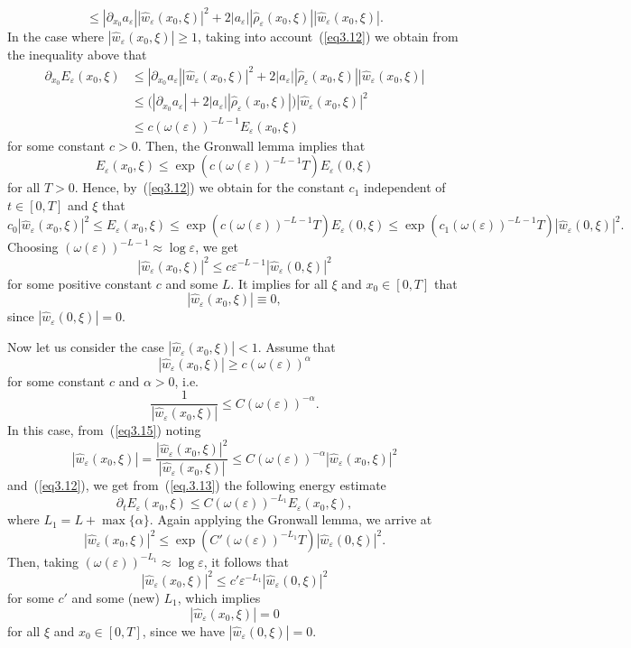 \documentclass[12pt]{amsart}
\theoremstyle{definition}
\begin{document}
\begin{equation}
\label{eq.3.13}
 \leq |\partial_{x_0} a_\varepsilon| |\hat{w}_\varepsilon(x_0, \xi)|^2 + 2 |a_\varepsilon| |\hat{\rho}_\varepsilon(x_0, \xi)| |\hat{w}_\varepsilon(x_0, \xi)|.  
\end{equation}
In the case where $|\hat{w}_\varepsilon(x_0, \xi)| \geq 1$, taking into account~(\ref{eq3.12}) we obtain from the inequality above that
\begin{align*}
\partial_{x_0} E_\varepsilon(x_0, \xi)&\leq |\partial_{x_0} a_\varepsilon| |\hat{w}_\varepsilon(x_0, \xi)|^2 + 2 |a_\varepsilon| |\hat{\rho}_\varepsilon(x_0, \xi)| |\hat{w}_\varepsilon(x_0, \xi)|\\
 &\leq \big(|\partial_{x_0} a_\varepsilon| + 2 |a_\varepsilon| |\hat{\rho}_\varepsilon(x_0, \xi)| \big) |\hat{w}_\varepsilon(x_0, \xi)|^2 \\ 
 &\leq c (\omega(\varepsilon))^{-L-1} E_\varepsilon(x_0, \xi)
\end{align*}
for some constant $c > 0$. Then, the Gronwall lemma implies that
\[
E_\varepsilon(x_0, \xi) \leq \exp(c (\omega(\varepsilon))^{-L-1} T) E_\varepsilon(0, \xi)
\]
for all $T > 0$. Hence, by~(\ref{eq3.12}) we obtain for the constant $c_1$ independent of $t \in [0, T]$ and $\xi$ that
\[
c_0 |\hat{w}_\varepsilon(x_0, \xi)|^2 \leq E_\varepsilon(x_0, \xi)\leq \exp(c (\omega(\varepsilon))^{-L-1} T) E_\varepsilon(0, \xi) \leq \exp(c_1 (\omega(\varepsilon))^{-L-1} T) |\hat{w}_\varepsilon(0, \xi)|^2.
\]
Choosing $(\omega(\varepsilon))^{-L-1} \approx \log \varepsilon$, we get
\[
|\hat{w}_\varepsilon(x_0, \xi)|^2 \leq c \varepsilon^{-L-1} |\hat{w}_\varepsilon(0, \xi)|^2
\]
for some positive constant $c$ and some $L$. It implies for all $\xi$ and $x_0 \in [0, T]$ that
\[
|\hat{w}_\varepsilon(x_0, \xi)| \equiv 0,
\]
since $|\hat{w}_\varepsilon(0, \xi)| = 0$.

Now let us consider the case $|\hat{w}_\varepsilon(x_0, \xi)| < 1$. Assume that
\[
|\hat{w}_\varepsilon(x_0, \xi)| \geq c (\omega(\varepsilon))^\alpha
\]
for some constant $c$ and $\alpha > 0$, i.e.
\begin{equation}
\label{eq3.15}
\frac{1}{|\hat{w}_\varepsilon(x_0, \xi)|} \leq C (\omega(\varepsilon))^{-\alpha}.
\end{equation}
In this case, from~(\ref{eq3.15}) noting
\[
|\hat{w}_\varepsilon(x_0, \xi)| = \frac{|\hat{w}_\varepsilon(x_0, \xi)|^2}{|\hat{w}_\varepsilon(x_0, \xi)|} \leq C (\omega(\varepsilon))^{-\alpha} |\hat{w}_\varepsilon(x_0, \xi)|^2
\]
and~(\ref{eq3.12}), we get from~(\ref{eq.3.13}) the following energy estimate
\[
\partial_t E_\varepsilon(x_0, \xi) \leq C (\omega(\varepsilon))^{-L_1} E_\varepsilon(x_0, \xi),
\]
where $L_1 = L + \max\{\alpha\}$. Again applying the Gronwall lemma, we arrive at
\[
|\hat{w}_\varepsilon(x_0, \xi)|^2 \leq \exp(C' (\omega(\varepsilon))^{-L_1} T) |\hat{w}_\varepsilon(0, \xi)|^2.
\]
Then, taking $(\omega(\varepsilon))^{-L_1} \approx \log \varepsilon$, it follows that
\[
|\hat{w}_\varepsilon(x_0, \xi)|^2 \leq c' \varepsilon^{-L_1} |\hat{w}_\varepsilon(0, \xi)|^2
\]
for some $c'$ and some (new) $L_1$, which implies
\[
|\hat{w}_\varepsilon(x_0, \xi)| = 0
\]
for all $\xi$ and $x_0 \in [0, T]$, since we have $|\hat{w}_\varepsilon(0, \xi)| = 0$.
\end{document}
